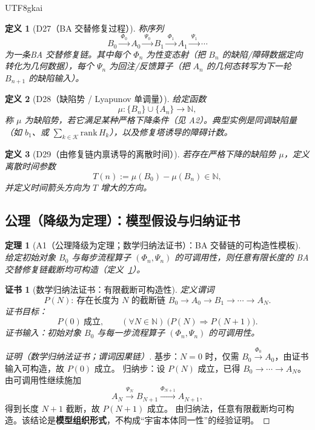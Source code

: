 \documentclass[12pt]{article}
\newtheorem{definition}{定义}[section]
\newtheorem{theorem}{定理}[section]
\newtheorem{Certificate}{证书}[section]
\begin{document}
\begin{CJK*}{UTF8}{gkai}
\begin{definition}[D27（BA 交替修复过程）]
\label{def:D27}
称序列
\[
B_0 \xrightarrow{\ \Phi_0\ } A_0 \xrightarrow{\ \Psi_0\ } B_1 \xrightarrow{\ \Phi_1\ } A_1 \xrightarrow{\ \Psi_1\ }
  \cdots
\]
为一条\emph{BA 交替修复链}。其中每个 $\Phi_n$ 为性变态射（把 $B_n$ 的缺陷/障碍数据定向转化为几何数据），每个 $\Psi_n$ 为回注/反馈算子（把 $A_n$ 的几何态转写为下一轮 $B_{n+1}$
  的缺陷输入）。
\end{definition}

\begin{definition}[D28（缺陷势 / Lyapunov 单调量）]
\label{def:D28}
给定函数
\[
\mu:\{B_n\}\cup\{A_n\}\to\mathbb N,
\]
称 $\mu$ 为缺陷势，若它满足某种严格下降条件（见 A2）。典型实例是同调缺陷量（如 $b_1$、或 $\sum_{k\in\mathcal K}\mathrm{rank}\,H_k$），以及修复塔诱导的障碍计数。
\end{definition}

\begin{definition}[D29（由修复链内禀诱导的离散时间）]
\label{def:D29}
若存在严格下降的缺陷势 $\mu$，定义离散时间参数
\[
T(n):=\mu(B_0)-\mu(B_n)\in\mathbb N,
\]
并定义时间箭头方向为 $T$ 增大的方向。
\end{definition}

\subsection{公理（降级为定理）：模型假设与归纳证书}

\begin{theorem}[A1（公理降级为定理；数学归纳法证书）：BA 交替链的可构造性模板]
\label{thm:A1-ba}
给定初始对象 $B_0$ 与每步流程算子 $(\Phi_n,\Psi_n)$ 的可调用性，则任意有限长度的 BA 交替修复链截断均可构造（定义~\ref{def:D27}）。
\end{theorem}

\begin{Certificate}[数学归纳法证书：有限截断可构造性]
\label{cert:A1-ba}
定义谓词
\[
P(N):\ \text{存在长度为 }N\text{ 的截断链 }
B_0\to A_0\to B_1\to\cdots\to A_N.
\]
证书目标：
\[
P(0)\ \text{成立},\qquad (\forall N\in\mathbb N)\ \bigl(P(N)\Rightarrow P(N+1)\bigr).
\]
证书输入：初始对象 $B_0$ 与每一步流程算子 $(\Phi_n,\Psi_n)$ 的可调用性。
\end{Certificate}

\begin{proof}[证明（数学归纳法证书；谓词因果链）]
基步：$N=0$ 时，仅需 $B_0\xrightarrow{\Phi_0}A_0$，由证书输入可构造，故 $P(0)$ 成立。
归纳步：设 $P(N)$ 成立，已得 $B_0\to\cdots\to A_N$。由可调用性继续施加
\[
A_N\xrightarrow{\Psi_N}B_{N+1}\xrightarrow{\Phi_{N+1}}A_{N+1},
\]
得到长度 $N+1$ 截断，故 $P(N+1)$ 成立。
由归纳法，任意有限截断均可构造。该结论是\textbf{模型组织形式}，不构成“宇宙本体同一性”的经验证明。
\end{proof}


\end{CJK*}
\end{document}
